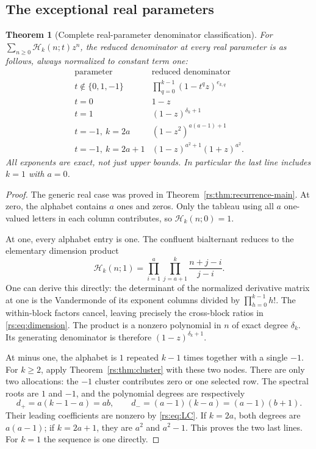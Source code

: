 \documentclass[11pt]{article}
\newtheorem{theorem}{Theorem}[section]
\theoremstyle{definition}
\theoremstyle{remark}
\newcommand{\Ht}{\mathcal H}
\theoremstyle{definition}
\theoremstyle{plain}
\numberwithin{equation}{section}
\begin{document}
\subsection{The exceptional real parameters}
\begin{theorem}[Complete real-parameter denominator classification]
\label{rs:thm:real}
For $\sum_{n\ge0}\Ht_k(n;t)z^n$, the reduced denominator at every real
parameter is as follows, always normalized to constant term one:
\begin{equation}
\begin{array}{c|l}
\text{parameter} & \text{reduced denominator}\\ \hline
 t\notin\{0,1,-1\} & \displaystyle\prod_{q=0}^{k-1}(1-t^qz)^{e_{k,q}}\\[5pt]
 t=0 & 1-z\\[2pt]
 t=1 & (1-z)^{\delta_k+1}\\[2pt]
 t=-1,\ k=2a & (1-z^2)^{a(a-1)+1}\\[2pt]
 t=-1,\ k=2a+1 & (1-z)^{a^2+1}(1+z)^{a^2}.
\end{array}
\label{rs:eq:real-table}
\end{equation}
All exponents are exact, not just upper bounds. In particular the last
line includes $k=1$ with $a=0$.
\end{theorem}
\begin{proof}
The generic real case was proved in Theorem~\ref{rs:thm:recurrence-main}.
At zero, the alphabet contains $a$ ones and zeros. Only the tableau using
all $a$ one-valued letters in each column contributes, so $\Ht_k(n;0)=1$.

At one, every alphabet entry is one. The confluent bialternant reduces to
the elementary dimension product
\begin{equation}
 \Ht_k(n;1)=\prod_{i=1}^{a}\prod_{j=a+1}^{k}\frac{n+j-i}{j-i}.
 \label{rs:eq:dimension}
\end{equation}
One can derive this directly: the determinant of the normalized derivative
matrix at one is the Vandermonde of its exponent columns divided by
$\prod_{h=0}^{k-1}h!$. The within-block factors cancel, leaving precisely
the cross-block ratios in \eqref{rs:eq:dimension}. The product is a nonzero
polynomial in $n$ of exact degree $\delta_k$. Its generating denominator is
therefore $(1-z)^{\delta_k+1}$.

At minus one, the alphabet is $1$ repeated $k-1$ times together with a
single $-1$. For $k\ge2$, apply Theorem~\ref{rs:thm:cluster} with these two
nodes. There are only two allocations: the $-1$ cluster contributes zero
or one selected row. The spectral roots are $1$ and $-1$, and the polynomial
degrees are respectively
\[
 d_+=a(k-1-a)=ab,\qquad d_-=(a-1)(k-a)=(a-1)(b+1).
\]
Their leading coefficients are nonzero by \eqref{rs:eq:LC}. If $k=2a$, both
degrees are $a(a-1)$; if $k=2a+1$, they are $a^2$ and $a^2-1$.
This proves the two last lines. For $k=1$ the sequence is one directly.
\end{proof}
\end{document}
